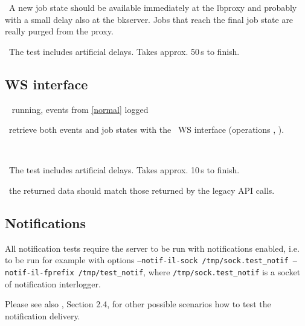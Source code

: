 \result\ A new job state should be available immediately at the
lbproxy and probably with a small delay also at the bkserver. Jobs that reach the final job state
are really purged from the proxy.

\note\ The test includes artificial delays. Takes approx. 50\,s to finish.


\subsection{WS interface}
\req\  running, events from \ref{normal} logged

\what\ retrieve both events and job states with the \LB\ WS interface
(operations , ).

\how\ 

\note\ The test includes artificial delays. Takes approx. 10\,s to finish.

\result\ the returned data should match those returned by the legacy API calls.











\subsection{Notifications}

All notification tests require the \LB server to be run with notifications enabled,
i.e. to be run for example with options 
\texttt{--notif-il-sock /tmp/sock.test\_notif --notif-il-fprefix /tmp/test\_notif}, 
where \texttt{/tmp/sock.test\_notif} is a socket of notification interlogger.

Please see also \cite{lbug}, Section 2.4, for other possible scenarios how to test the notification delivery.


